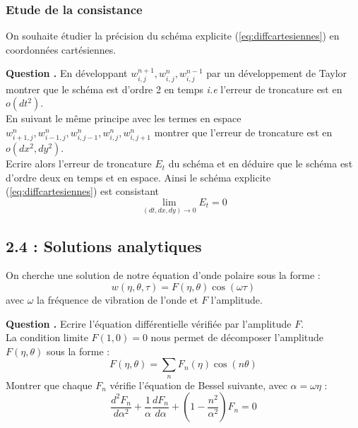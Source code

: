 \documentclass[a4,12pt]{article}
\newcounter{Nbquestion}
\newcommand*\question{%
\stepcounter{Nbquestion}%
\textbf{Question \theNbquestion. }}
\begin{document}
        \subsubsection{Etude de la consistance}
        On souhaite étudier la précision du schéma explicite (\ref{eq:diffcartesiennes}) en coordonnées cartésiennes.


        \question En développant $w_{i,j}^{n+1},w_{i,j}^{n},w_{i,j}^{n-1}$ par un développement de Taylor montrer que le schéma est d'ordre 2 en temps \textit{i.e} l'erreur de troncature est en $o(dt^2)$.\\
            En suivant le même principe avec les termes en espace $w_{i+1,j}^{n},w_{i-1,j}^{n},w_{i,j-1}^{n},w_{i,j}^{n},w_{i,j+1}^{n}$ montrer que l'erreur de troncature est en $o (dx^2,dy^2)$.\\
            Ecrire alors l'erreur de troncature $E_t$ du schéma et en déduire que le schéma est d'ordre deux en temps et en espace. Ainsi le schéma explicite (\ref{eq:diffcartesiennes}) est consistant 
            \[
            \lim_{(dt,dx,dy)\longrightarrow 0} E_t=0
            \]


            \subsection*{2.4 : Solutions analytiques }
            On cherche une solution de notre équation d'onde polaire sous la forme :
    \[
w(\eta,\theta,\tau)=F(\eta,\theta)\cos(\omega \tau)
    \]
    avec $\omega$ la fréquence de vibration de l'onde et $F$ l'amplitude.


    \question Ecrire l'équation différentielle vérifiée par l'amplitude $F$.\\

    La condition limite $F(1,0)=0$ nous permet de décomposer l'amplitude $F(\eta,\theta)$ sous la forme :
    \[
F(\eta,\theta)=\sum_n F_n(\eta)\cos(n\theta)
    \]
    Montrer que chaque $F_n$ vérifie l'équation de Bessel suivante, avec  $\alpha=\omega\eta$ :
    \[
    \frac{d^2 F_n}{d\alpha^2}+\frac{1}{\alpha}\frac{dF_n}{d\alpha}+\left(1-\frac{n^2}{\alpha^2}\right)F_n=0
    \]

\end{document}
